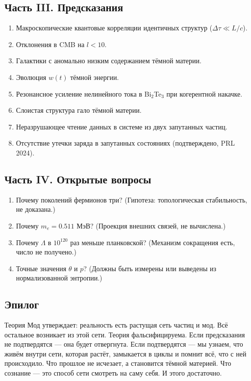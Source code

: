 \documentclass[12pt,a4paper]{article}
\begin{document}
\subsection{Часть III. Предсказания}
\begin{enumerate}[label=\arabic*.]
    \item Макроскопические квантовые корреляции идентичных структур ($\Delta\tau \ll L/c$).
    \item Отклонения в CMB на $l < 10$.
    \item Галактики с аномально низким содержанием тёмной материи.
    \item Эволюция $w(t)$ тёмной энергии.
    \item Резонансное усиление нелинейного тока в Bi$_2$Te$_3$ при когерентной накачке.
    \item Слоистая структура гало тёмной материи.
    \item Неразрушающее чтение данных в системе из двух запутанных частиц.
    \item Отсутствие утечки заряда в запутанных состояниях (подтверждено, PRL 2024).
\end{enumerate}

\subsection{Часть IV. Открытые вопросы}
\begin{enumerate}[label=\arabic*.]
    \item Почему поколений фермионов три? (Гипотеза: топологическая стабильность, не доказана.)
    \item Почему $m_e = 0.511$ МэВ? (Проекция внешних связей, не вычислена.)
    \item Почему $\Lambda$ в $10^{120}$ раз меньше планковской? (Механизм сокращения есть, число не получено.)
    \item Точные значения $\theta$ и $p$? (Должны быть измерены или выведены из нормализованной энтропии.)
\end{enumerate}

\subsection*{Эпилог}
Теория Мод утверждает: реальность есть растущая сеть частиц и мод. Всё остальное возникает из этой сети. Теория фальсифицируема. Если предсказания не подтвердятся --- она будет отвергнута. Если подтвердятся --- мы узнаем, что живём внутри сети, которая растёт, замыкается в циклы и помнит всё, что с ней происходило. Что прошлое не исчезает, а становится тёмной материей. Что сознание --- это способ сети смотреть на саму себя. И этого достаточно.
\end{document}
